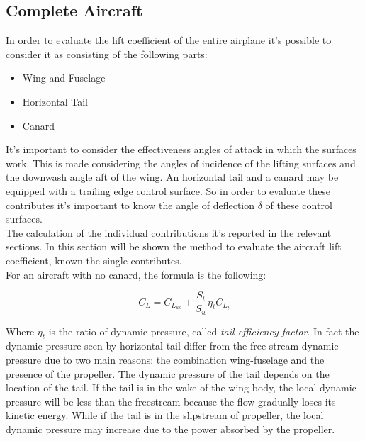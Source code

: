 		




\subsection{Complete Aircraft}

In order to evaluate the lift coefficient of the entire airplane it's possible to consider it as consisting of the following parts\cite{ roskam2002airplane}:

\begin{itemize}
\item Wing and Fuselage
\item Horizontal Tail
\item Canard
\end{itemize}

It's important to consider the effectiveness angles of attack in which the surfaces work. This is made considering the angles of incidence of the lifting surfaces and the downwash angle aft of the wing. An horizontal tail and a canard may be equipped with a trailing edge control surface. So in order to evaluate these contributes it's important to know the angle of deflection $\delta$ of these control surfaces.\\
The calculation of the individual contributions it's reported in the relevant sections. In this section will be shown the method to evaluate the aircraft lift coefficient, known the single contributes.\\
For an aircraft with no canard, the formula is the following:

\begin{equation}
C_L = C_{L_{wb}} + \frac{S_t}{S_w} \eta_t C_{L_{t}}
\end{equation}

Where $\eta_t$ is the ratio of dynamic pressure, called {\itshape tail efficiency factor}. In fact the dynamic pressure seen by horizontal tail differ from the free stream dynamic pressure due to two main reasons: the combination wing-fuselage and the presence of the propeller. The dynamic pressure of the tail depends on the location of the tail. If the tail is in the wake of the wing-body, the local dynamic pressure will be less than the freestream because the flow gradually loses its kinetic energy. While if the tail is in the slipstream of propeller, the local dynamic pressure may increase due to the power absorbed by the propeller.



